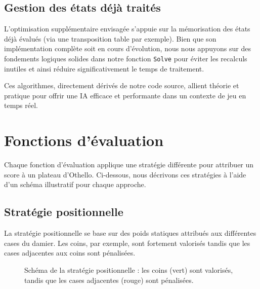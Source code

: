 \documentclass[a4paper,12pt]{article}
\begin{document}
\subsection{Gestion des états déjà traités}
L'optimisation supplémentaire envisagée s'appuie sur la mémorisation des états déjà évalués (via une transposition table par exemple). Bien que son implémentation complète soit en cours d'évolution, nous nous appuyons sur des fondements logiques solides dans notre fonction \texttt{Solve} pour éviter les recalculs inutiles et ainsi réduire significativement le temps de traitement.

\bigskip
\noindent Ces algorithmes, directement dérivés de notre code source, allient théorie et pratique pour offrir une IA efficace et performante dans un contexte de jeu en temps réel.

\section{Fonctions d'évaluation}

Chaque fonction d'évaluation applique une stratégie différente pour attribuer un score à un plateau d'Othello. Ci-dessous, nous décrivons ces stratégies à l'aide d'un schéma illustratif pour chaque approche.

\subsection{Stratégie positionnelle}
La stratégie positionnelle se base sur des poids statiques attribués aux différentes cases du damier. Les coins, par exemple, sont fortement valorisés tandis que les cases adjacentes aux coins sont pénalisées.
\begin{figure}[H]
\centering
{}
\caption{Schéma de la stratégie positionnelle : les coins (vert) sont valorisés, tandis que les cases adjacentes (rouge) sont pénalisées.}
\label{fig:positional}
\end{figure}
\end{document}
